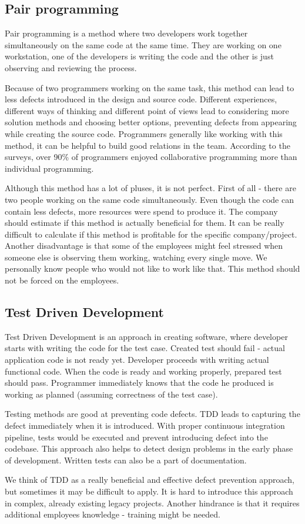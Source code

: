 \subsection{Pair programming}
Pair programming is a method where two developers work together simultaneously on the same code at the same time. They are working on one workstation, one of the developers is writing the code and the other is just observing and reviewing the process.

Because of two programmers working on the same task, this method can lead to less defects introduced in the design and source code. Different experiences, different ways of thinking and different point of views lead to considering more solution methods and choosing better options, preventing defects from appearing while creating the source code. Programmers generally like working with this method, it can be helpful to build good relations in the team. According to the surveys, over 90\% of programmers enjoyed collaborative programming more than individual programming\cite{pp}.

Although this method has a lot of pluses, it is not perfect. First of all - there are two people working on the same code simultaneously. Even though the code can contain less defects, more resources were spend to produce it. The company should estimate if this method is actually beneficial for them. It can be really difficult to calculate if this method is profitable for the specific company/project. Another disadvantage is that some of the employees might feel stressed when someone else is observing them working, watching every single move. We personally know people who would not like to work like that. This method should not be forced on the employees. 

\subsection{Test Driven Development}
Test Driven Development is an approach in creating software, where developer starts with writing the code for the test case. Created test should fail - actual application code is not ready yet. Developer proceeds with writing actual functional code. When the code is ready and working properly, prepared test should pass. Programmer immediately knows that the code he produced is working as planned (assuming correctness of the test case).

Testing methods are good at preventing code defects\cite{capers}. TDD leads to capturing the defect immediately when it is introduced. With proper continuous integration pipeline, tests would be executed and prevent introducing defect into the codebase. This approach also helps to detect design problems in the early phase of development. Written tests can also be a part of documentation.

We think of TDD as a really beneficial and effective defect prevention approach, but sometimes it may be difficult to apply. It is hard to introduce this approach in complex, already existing legacy projects. Another hindrance is that it requires additional employees knowledge - training might be needed. 

